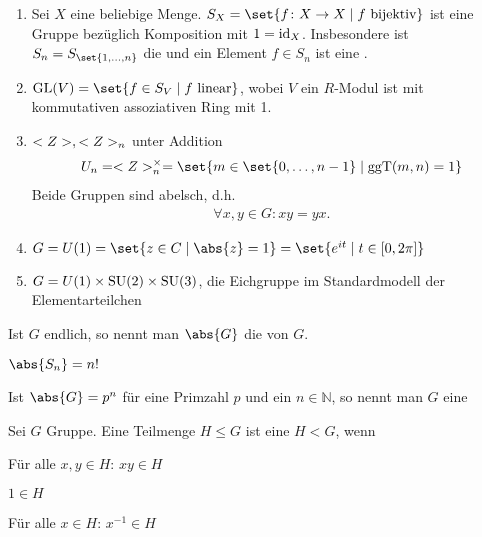 \begin{example}
	\begin{enumerate}[label={\arabic*)}]
		\item Sei $X$ eine beliebige Menge. $S_X = \set{f\colon X \to X \mid f \text{ bijektiv}}$ ist eine Gruppe bezüglich Komposition mit $1 = \operatorname{id}_X$. Insbesondere ist $S_n = S_{\set{1,\dots,n}}$ die  und ein Element $f \in S_n$ ist eine .
		\item $\GL(V) = \set{f \in S_V \mid f \text{ linear}}$, wobei $V$ ein $R$-Modul ist mit kommutativen assoziativen Ring mit 1.
		\item $<Z>, <Z>_n$ unter Addition 
		\begin{align*}
			U_n = \Z^{\times}_n = \set{ m \in \set{0,\dots,n-1} \mid \ggT(m,n) = 1}
		\end{align*}
		Beide Gruppen sind abelsch, d.h. \begin{align*}
			\forall x,y \in G: xy = yx.
		\end{align*}
		\item $G = U(1) = \set{z \in C \mid \abs{z} = 1} = \set{e^{it}\mid t \in [0,2\pi]}$
		\item $G = U(1) \times \operatorname{SU}(2)\times \operatorname{SU}(3)$, die Eichgruppe im Standardmodell der Elementarteilchen  
	\end{enumerate}
\end{example}

\begin{definition}[Ordnung]
	Ist $G$ endlich, so nennt man $\abs{G}$ die  von $G$.
\end{definition}

\begin{example}
	$\abs{S_n} = n!$
\end{example}

\begin{definition}[$p$-Gruppe]
	Ist $\abs{G} = p^n$ für eine Primzahl $p$ und ein $n\in\mathbb N$, so nennt man $G$ eine 
\end{definition}

\begin{definition}[Untergruppe]
	Sei $G$ Gruppe. Eine Teilmenge $H \le G$ ist eine  $H < G$, wenn
	\begin{defenum}
		\item \label{1_1_9_i} Für alle $x,y \in H$: $xy \in H$
		\item \label{1_1_9_ii} $1 \in H$
		\item \label{1_1_9_iii} Für alle $x \in H$: $x^{-1} \in H$ 
	\end{defenum}
\end{definition}

